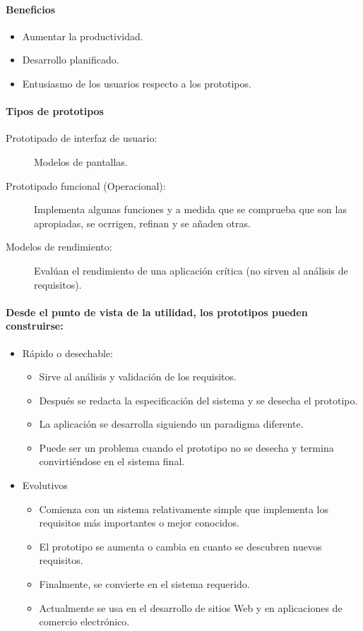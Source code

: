 \paragraph{Beneficios}
\begin{itemize}
\item Aumentar la productividad.
\item Desarrollo planificado.
\item Entusiasmo de los usuarios respecto a los prototipos.
\end{itemize}
\paragraph{Tipos de prototipos}
\begin{description}
\item[Prototipado de interfaz de usuario:] Modelos de pantallas.
\item[Prototipado funcional (Operacional):] Implementa algunas funciones y a medida que se comprueba que son las apropiadas, se ocrrigen, refinan y se añaden otras.
\item[Modelos de rendimiento:] Evalúan el rendimiento de una aplicación crítica (no sirven al análisis de requisitos).
\end{description}
\paragraph{Desde el punto de vista de la utilidad, los prototipos pueden construirse:}
\begin{itemize}
\item Rápido o desechable:
\begin{itemize}
\item Sirve al análisis y validación de los requisitos.
\item Después se redacta la especificación del sistema y se desecha el prototipo.
\item La aplicación se desarrolla siguiendo un paradigma diferente.
\item Puede ser un problema cuando el prototipo no se desecha y termina convirtiéndose en el sistema final.
\end{itemize}
\item Evolutivos
\begin{itemize}
\item Comienza con un sistema relativamente simple que implementa los requisitos más importantes o mejor conocidos.
\item El prototipo se aumenta o cambia en cuanto se descubren nuevos requisitos.
\item Finalmente, se convierte en el sistema requerido.
\item Actualmente se usa en el desarrollo de sitios Web y en aplicaciones de comercio electrónico.
\end{itemize}
\end{itemize}
